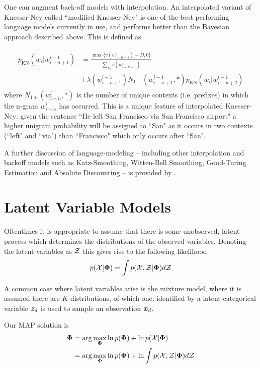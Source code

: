 One can augment back-off models with interpolation. An interpolated variant of Knesser-Ney called ``modified Knesser-Ney"\cite{Chen1999} is one of the best performing language models currently in use, and performs better than the Bayesian approach described above\cite{Teh2002}. This is defined as

\begin{align}
\begin{split}
p_\text{KN}(w_i | w^{i-1}_{i-n+1}) & = 
\frac{\max\{c(w^i_{i-n+1}) - D, 0\}}{\sum_{w_i} c(w^i_{i-n+1})} \\
& + \lambda(w^{i-1}_{i-n+1}) N_{1+}(w^{i-1}_{i-n+1}, *) p_\text{KN}(w_i | w^{i-1}_{i-n+2})
\end{split}
\end{align}
where $N_{1+}(w^{i}_{i-n}, *)$ is the number of unique contexts (i.e. prefixes) in which the n-gram $w^{i}_{i-n}$ has occurred.  This is a unique feature of interpolated Knesser-Ney: given the sentence ``He left San Francisco via San Francisco airport" a higher unigram probability will be assigned to ``San" as it occurs in two contexts (``left" and ``via") than ``Francisco" which only occurs after ``San".

A further discussion of language-modeling -- including other interpolation and backoff models such as Katz-Smoothing, Witten-Bell Smoothing, Good-Turing Estimation and Absolute Discounting -- is provided by \cite{Goodman2001}.


 
\section{Latent Variable Models}
Oftentimes it is appropriate to assume that there is some unobserved, latent process which determines the distributions of the observed variables. Denoting the latent variables as ${ \mathcal{Z} }$ this gives rise to the following likelihood
\begin{align}
p({ \mathcal{X} }|{ \bm \Phi }) = \int p({ \mathcal{X} }, { \mathcal{Z} }|{ \bm \Phi }) d{ \mathcal{Z} }
\end{align}

A common case where latent variables arise is the mixture model, where it is assumed there are $K$ distributions, of which one, identified by a latent categorical variable $\bm z_d$ is used to sample an observation ${ \bm x_d }$. 

Our MAP solution is
\begin{align}
\begin{split}
{  \bm \Phi  } 
    &= \arg \max_{ \bm \Phi } \ln p({ \bm \Phi }) + \ln p({ \mathcal{X} }|{ \bm \Phi }) \\
    &= \arg \max_{ \bm \Phi } \ln p({ \bm \Phi }) + \ln \int { p( { \mathcal{X} } ,  { \mathcal{Z} } |  {  \bm \Phi  } ) } d{ \mathcal{Z} } \label{eqn:em-problem}
\end{split}
\end{align}

